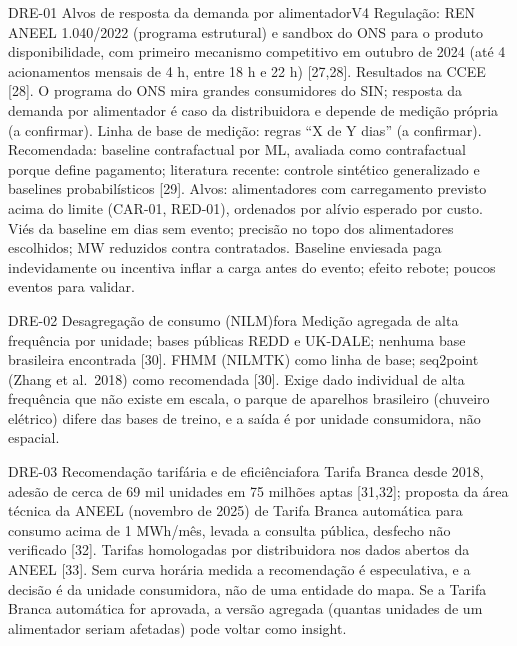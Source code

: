 \begin{ficha}{DRE-01 \textperiodcentered{} Alvos de resposta da demanda por alimentador}{V4}
 Regulação: REN ANEEL 1.040/2022 (programa estrutural) e sandbox
do ONS para o produto disponibilidade, com primeiro mecanismo competitivo em
outubro de 2024 (até 4 acionamentos mensais de 4 h, entre 18 h e 22 h)
[27,28]. Resultados na CCEE [28]. O programa do ONS mira grandes consumidores
do SIN; resposta da demanda por alimentador é caso da distribuidora e depende
de medição própria (a confirmar).
 Linha de base de medição: regras ``X de Y dias'' (a
confirmar). Recomendada: baseline contrafactual por ML, avaliada como
contrafactual porque define pagamento; literatura recente: controle sintético
generalizado e baselines probabilísticos [29]. Alvos: alimentadores com
carregamento previsto acima do limite (CAR-01, RED-01), ordenados por alívio
esperado por custo.
 Viés da baseline em dias sem evento; precisão no topo dos
alimentadores escolhidos; MW reduzidos contra contratados.
 Baseline enviesada paga indevidamente ou incentiva inflar
a carga antes do evento; efeito rebote; poucos eventos para validar.
\end{ficha}

\begin{ficha}{DRE-02 \textperiodcentered{} Desagregação de consumo (NILM)}{fora}
 Medição agregada de alta frequência por unidade; bases públicas
REDD e UK-DALE; nenhuma base brasileira encontrada [30].
 FHMM (NILMTK) como linha de base; seq2point (Zhang et
al.\ 2018) como recomendada [30].
 Exige dado individual de alta frequência que não
existe em escala, o parque de aparelhos brasileiro (chuveiro elétrico) difere
das bases de treino, e a saída é por unidade consumidora, não espacial.
\end{ficha}

\begin{ficha}{DRE-03 \textperiodcentered{} Recomendação tarifária e de eficiência}{fora}
 Tarifa Branca desde 2018, adesão de cerca de 69 mil unidades em
75 milhões aptas [31,32]; proposta da área técnica da ANEEL (novembro de 2025)
de Tarifa Branca automática para consumo acima de 1 MWh/mês, levada a consulta
pública, desfecho não verificado [32]. Tarifas homologadas por distribuidora
nos dados abertos da ANEEL [33].
 Sem curva horária medida a recomendação é
especulativa, e a decisão é da unidade consumidora, não de uma entidade do
mapa. Se a Tarifa Branca automática for aprovada, a versão agregada (quantas
unidades de um alimentador seriam afetadas) pode voltar como insight.
\end{ficha}

